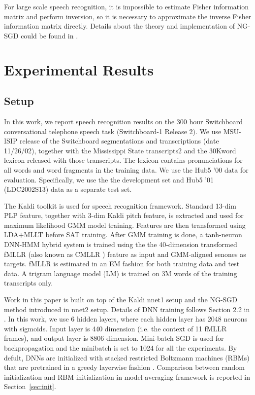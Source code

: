\documentclass{article}
\begin{document}
For large scale speech recognition, it is impossible to estimate Fisher information matrix and perform inversion, 
so it is necessary to approximate the inverse Fisher information matrix directly. Details about the theory and 
implementation of NG-SGD could be found in \cite{povey2014parallel}.

\section{Experimental Results}
\subsection{Setup}
In this work, we report speech recognition results on the 300 hour Switchboard conversational telephone speech task 
(Switchboard-1 Release 2). We use MSU-ISIP release of the Switchboard segmentations and transcriptions (date 11/26/02),
together with the Mississippi State transcripts2 and the 30Kword lexicon released with those transcripts. 
The lexicon contains pronunciations for all words and word fragments in the training data. We use the Hub5 ’00 data for
evaluation. Specifically, we use the  the development set and Hub5 ’01 (LDC2002S13) data as a separate test set.

The Kaldi toolkit\cite{kaldi11} is used for speech recognition framework. Standard 13-dim PLP feature,
together with 3-dim Kaldi pitch feature, is extracted and used for maximum
likelihood GMM model training. Features are then transformed using LDA+MLLT before SAT training.
After GMM training is done, a tanh-neuron DNN-HMM hybrid system is trained using the the 40-dimension 
transformed fMLLR (also known as CMLLR \cite{gales1996generation}) feature as input and GMM-aligned senones 
as targets. fMLLR is estimated in an EM fashion for both training data and test data. A trigram language model (LM) is trained 
on 3M words of the training transcripts only.

Work in this paper is built on top of the Kaldi nnet1 setup and the NG-SGD method introduced in nnet2 setup. 
Details of DNN training follows Section 2.2 in \cite{vesely2013sequence}. In this work, we use 6 hidden layers, where each 
hidden layer has 2048 neurons with sigmoids. Input layer is 440 dimension (i.e. the context of 11 fMLLR frames), 
and output layer is 8806 dimension. Mini-batch SGD is used for backpropagation and the minibatch is set to 1024 for all
the experiments. By defult, DNNs are initialized with stacked restricted Boltzmann machines (RBMs) that are pretrained 
in a greedy layerwise fashion \cite{hinton2006fast}. Comparison between random initialization and RBM-initialization 
in model averaging framework is reported in Section~\ref{sec:init}.
\end{document}
